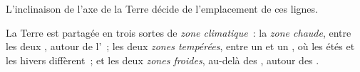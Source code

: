 L'inclinaison de l'axe de la Terre décide de l'emplacement de ces lignes.

\begin{definition}\label{def:g5:weather-and-climate:climate-zone}
La Terre est partagée en trois sortes de
\emph{zone climatique}~: la \emph{zone chaude},
entre les deux , autour de l'~; les deux
\emph{zones tempérées}, entre un  et un , où les étés
et les hivers diffèrent~; et les deux \emph{zones froides}, au-delà des
, autour des .
\end{definition}

